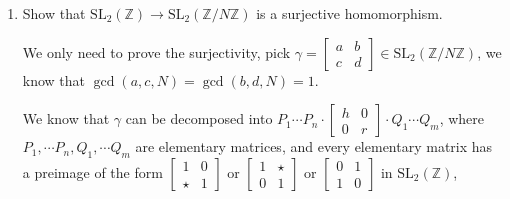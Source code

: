 \begin{enumerate}
\begin{proofc}
Equivalently, 

$$\begin{bmatrix}
    f_1(0) & f_1(\frac12) & f_1(\infty) \\
    f_2(0) & f_2(\frac12) & f_2(\infty) \\
    f_3(0) & f_3(\frac12) & f_3(\infty) 
\end{bmatrix} \cdot \begin{bmatrix}
    A_1 \\
    A_2 \\
    A_3
\end{bmatrix} = 0.$$

Because there are no cusp forms in $M_2(\Gamma_0(4))$, the three vectors $(f_i(0), f_i(\frac12), f_i (\infty))$ are linearly independent, 
therefore

$$\begin{bmatrix}
    A_1 \\
    A_2 \\
    A_3
\end{bmatrix} = 0,$$

Contradict to $A_1 = 1$!

\end{proofc}









\item Show that $\mathrm{SL}_2(\mathbb{Z}) \to \mathrm{SL}_2(\mathbb{Z}/N\mathbb{Z})$ is a surjective homomorphism.

\begin{proofc}[解答]
    We only need to prove the surjectivity, pick $\gamma = \begin{bmatrix}
        a & b \\
        c & d 
    \end{bmatrix} \in \mathrm{SL}_2(\mathbb{Z}/N\mathbb{Z})$, we know that $\gcd(a,c,N) = \gcd(b,d,N) = 1$.

    We know that $\gamma$ can be decomposed into $P_1 \cdots P_n \cdot \begin{bmatrix}
        h & 0 \\
        0 & r
    \end{bmatrix}\cdot Q_1 \cdots Q_m$, where $P_1, \cdots P_n, Q_1, \cdots Q_m$ are elementary matrices,
    and every elementary matrix has a preimage of the form $\begin{bmatrix}
        1 & 0 \\
        \star & 1
    \end{bmatrix} $ or $\begin{bmatrix}
        1 & \star \\
        0 & 1
    \end{bmatrix}$ or $\begin{bmatrix}
        0 & 1 \\
        1 & 0
    \end{bmatrix}$ in $\mathrm{SL}_2(\mathbb{Z})$,


\end{proofc}
\end{enumerate}
